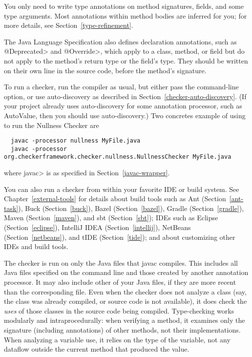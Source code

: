 You only need to write type annotations on method signatures, fields, and some type arguments.
Most annotations within method bodies are inferred for you; for more details,
see  Section~\ref{type-refinement}.

The Java Language Specification also defines
declaration annotations, such as \<@Deprecated> and \<@Override>, which apply
to a class, method, or field but do not apply to the method's return type
or the field's type.  They should be written on their own line in the
source code, before the method's signature.



To run a checker, run the compiler  as usual,
but either pass the  command-line
option, or use auto-discovery as described in
Section~\ref{checker-auto-discovery}.
(If your project already uses auto-discovery for some annotation processor,
such as AutoValue, then you should use auto-discovery.)
Two concretes example of using  to run the Nullness Checker are

\begin{Verbatim}
  javac -processor nullness MyFile.java
  javac -processor org.checkerframework.checker.nullness.NullnessChecker MyFile.java
\end{Verbatim}

\noindent
where \<javac> is as specified in Section~\ref{javac-wrapper}.

You can also run a checker from within your favorite IDE or build system.  See
Chapter~\ref{external-tools} for details about build tools such as
Ant (Section~\ref{ant-task}),
Buck (Section~\ref{buck}),
Bazel (Section~\ref{bazel}),
Gradle (Section~\ref{gradle}),
Maven (Section~\ref{maven}), and
sbt (Section~\ref{sbt});
IDEs such as
Eclipse (Section~\ref{eclipse}),
IntelliJ IDEA (Section~\ref{intellij}),
NetBeans (Section~\ref{netbeans}),
and
tIDE (Section~\ref{tide});
and about customizing other IDEs and build tools.

The checker is run on only the Java files that javac compiles.
This includes all Java files specified on the command line and those
created by another annotation processor.  It may also include other of
your Java files, if they are more recent than the corresponding  file.
Even when the checker does not analyze a class (say, the class was
already compiled, or source code is not available), it does check
the \emph{uses} of those classes in the source code being compiled.
Type-checking works modularly and intraprocedurally:  when verifying a
method, it examines only the signature (including annotations) of other
methods, not their implementations.  When analyzing a variable use, it
relies on the type of the variable, not any dataflow outside the current
method that produced the value.

